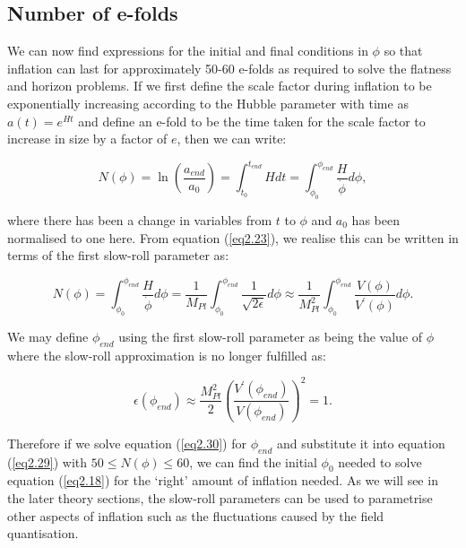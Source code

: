 \documentclass[a4paper,12pt,twoside]{report}
\begin{document}
\subsection{Number of e-folds} \label{subsec:NoEfolds}

We can now find expressions for the initial and final conditions in $\phi$ so that inflation can last for approximately 50-60 e-folds as required to solve the flatness and horizon problems. If we first define the scale factor during inflation to be exponentially increasing according to the Hubble parameter with time as $a(t) = e^{Ht}$ and define an e-fold to be the time taken for the scale factor to increase in size by a factor of $e$, then we can write:

\begin{equation} \label{eq2.28}
N(\phi) = \ln \left(\frac{a_{end}}{a_{0}}\right) = \int_{t_{0}}^{t_{end}} H dt = \int_{\phi_{0}}^{\phi_{end}} \frac{H}{\dot{\phi}} d\phi,
\end{equation}

where there has been a change in variables from $t$ to $\phi$ and $a_{0}$ has been normalised to one here. From equation (\ref{eq2.23}), we realise this can be written in terms of the first slow-roll parameter as:

\begin{equation} \label{eq2.29}
N(\phi) = \int_{\phi_{0}}^{\phi_{end}} \frac{H}{\dot{\phi}} d\phi = \frac{1}{M_{Pl}} \int_{\phi_{0}}^{\phi_{end}} \frac{1}{\sqrt{2\epsilon}} d\phi \approx \frac{1}{M_{Pl}^{2}} \int_{\phi_{0}}^{\phi_{end}} \frac{V(\phi)}{V^{\prime}(\phi)} d\phi.
\end{equation}

We may define $\phi_{end}$ using the first slow-roll parameter as being the value of $\phi$ where the slow-roll approximation is no longer fulfilled as:

\begin{equation} \label{eq2.30}
\epsilon(\phi_{end}) \approx \frac{M_{Pl}^{2}}{2} \left(\frac{V^{\prime}(\phi_{end})}{V(\phi_{end})}\right)^{2} = 1.
\end{equation}

Therefore if we solve equation (\ref{eq2.30}) for $\phi_{end}$ and substitute it into equation (\ref{eq2.29}) with $50 \le N(\phi) \le 60$, we can find the initial $\phi_{0}$ needed to solve equation (\ref{eq2.18}) for the `right' amount of inflation needed. As we will see in the later theory sections, the slow-roll parameters can be used to parametrise other aspects of inflation such as the fluctuations caused by the field quantisation.
\end{document}
